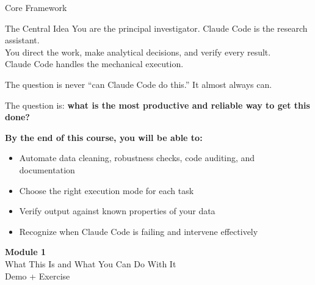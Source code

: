 \documentclass[aspectratio=169, 11pt]{beamer}
\begin{document}
\begin{frame}{Core Framework}
  \begin{alertblock}{The Central Idea}
    You are the principal investigator. Claude Code is the research assistant.\\
    You direct the work, make analytical decisions, and verify every result.\\
    Claude Code handles the mechanical execution.
  \end{alertblock}

  \vspace{0.5em}
  The question is never ``can Claude Code do this.'' It almost always can.

  \vspace{0.3em}
  The question is: \textbf{what is the most productive and reliable way to get this done?}

  \vspace{0.8em}
  \textbf{By the end of this course, you will be able to:}
  \begin{itemize}
    \item Automate data cleaning, robustness checks, code auditing, and documentation
    \item Choose the right execution mode for each task
    \item Verify output against known properties of your data
    \item Recognize when Claude Code is failing and intervene effectively
  \end{itemize}
\end{frame}


\begin{frame}[plain]
  \centering
  \vfill
  {\Large\textbf{Module 1}}\\[0.5em]
  {\large What This Is and What You Can Do With It}\\[0.3em]
  {\small Demo + Exercise}
  \vfill
\end{frame}

\end{document}

